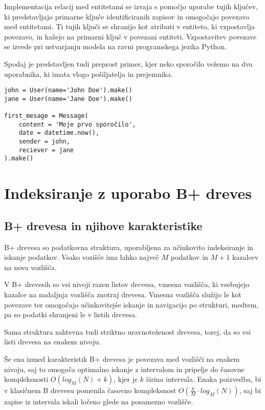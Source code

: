 \documentclass[a4paper,12pt,openright]{book}
\begin{document}
        Implementacija relacij med entitetami se izvaja s pomočjo uporabe tujih ključev, ki predstavljajo primarne ključe identificiranih zapisov in omogočajo povezavo med entitetami. Ti tujih ključi se shranijo kot atributi v entiteto, ki vzpostavlja povezavo, in kažejo na primarni ključ v povezani entiteti. Vzpostavitev povezave se izvede pri ustvarjanju modela na ravni programskega jezika Python.

        Spodaj je predstavljen tudi preprost primer, kjer neko sporočilo vežemo na dva uporabnika, ki imata vlogo pošiljatelja in prejemnika.
\begin{verbatim}
john = User(name='John Doe').make()
jane = User(name='Jane Doe').make()

first_mesage = Message(
    content = 'Moje prvo sporočilo',
    date = datetime.now(),
    sender = john,
    reciever = jane
).make()
\end{verbatim}

    \section{Indeksiranje z uporabo B+ dreves}
        \subsection{B+ drevesa in njihove karakteristike}

        B+ drevesa so podatkovna struktura, uporabljena za učinkovito indeksiranje in iskanje podatkov. Vsako vozišče ima lahko največ $M$ podatkov in $M+1$ kazalcev na nova vozlišča.

        V B+ drevesih so vsi nivoji razen listov drevesa, vmesna vozlišča, ki vsebujejo kazalce na nadaljnja vozlišča znotraj drevesa. Vmesna vozlišča služijo le kot povezave ter omogočajo učinkovitejše iskanje in navigacijo po strukturi, medtem, pa so podatki shranjeni le v listih drevesa.

        Sama struktura zahtevna tudi striktno uravnoteženost drevesa, torej, da so vsi listi drevesa na enakem nivoju.

        Še ena izmed karakteristik B+ drevesa je povezava med vozlišči na enakem nivoju, saj to omogoča optimalno iskanje z intervalom in pripelje do časovne kompleksnosti $O(log_M(N) + k)$, kjer je $k$ širina intervala. Enaka poizvedba, bi v klasičnem B drevesu pomenila časovno kompleksnost $O(\frac{k}{M} \cdot log_M(N))$, saj bi zapise iz intervala iskali ločeno glede na posamezno vozlišče.
\end{document}
